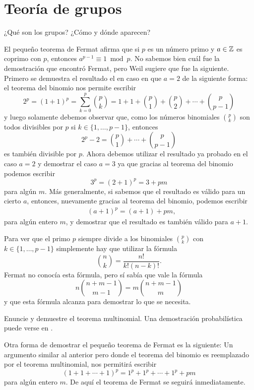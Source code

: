 \chapter{Teoría de grupos}

¿Qué son los grupos? ¿Cómo y dónde aparecen? 

El pequeño teorema de Fermat afirma que si $p$ es un número primo y $a\in\mathbb{Z}$ es
coprimo con $p$, entonces $a^{p-1}\equiv 1\bmod p$. No sabemos bien cuál fue la
demostración que encontró Fermat, pero Weil sugiere que fue la siguiente.
Primero se demuestra el resultado el en caso en que $a=2$ de la siguiente
forma: el teorema del binomio nos permite escribir
\[
	2^p=(1+1)^p=\sum_{k=0}^p\binom{p}{k}=1+1+\binom{p}{1}+\binom{p}{2}+\cdots+\binom{p}{p-1}
\]
y luego solamente debemos observar que, como los números binomiales
$\binom{p}{k}$ son todos divisibles por $p$ si $k\in\{1,\dots,p-1\}$, entonces
\[
	2^p-2=\binom{p}{1}+\cdots+\binom{p}{p-1}
\]
es también divisible por $p$. 
Ahora debemos utilizar el resultado ya probado en el caso $a=2$
y demostrar el caso $a=3$ ya que gracias al teorema del binomio podemos
escribir 
\[
	3^p=(2+1)^p=3+pm
\]
para algún $m$. Más generalmente, si sabemos que el resultado es válido para un
cierto $a$, entonces, nuevamente gracias al teorema del binomio, podemos
escribir 
\begin{align*}
	&(a+1)^p = (a+1)+pm,
\end{align*}
para algún entero $m$, y demostrar que el resultado es también válido para
$a+1$. 

Para ver que el primo $p$ siempre divide a los binomiales $\binom{p}{k}$ con $k\in\{1,\dots,p-1\}$ 
simplemente hay que utilizar la fórmula
\[
	\binom{n}{k}=\frac{n!}{k!(n-k)!}.
\]
Fermat no conocía esta fórmula, pero sí sabía que vale la fórmula
\[
	n\binom{n+m-1}{m-1}=m\binom{n+m-1}{m}
\]
y que esta fórmula alcanza para demostrar lo que se necesita.

\begin{exercise}
	Enuncie y demuestre el teorema multinomial. Una demostración
	probabilística puede verse en \cite{MR3453544}.
\end{exercise}

Otra forma de demostrar el pequeño teorema de Fermat es la siguiente:  
Un argumento similar al anterior pero donde el teorema del
binomio es reemplazado por el teorema multinomial, nos permitirá escribir 
\[
	(1+1+\cdots+1)^p=1^p+1^p+\cdots+1^p+pm
\]
para algún entero $m$. De aquí el teorema de Fermat se seguirá
inmediatamente. 


